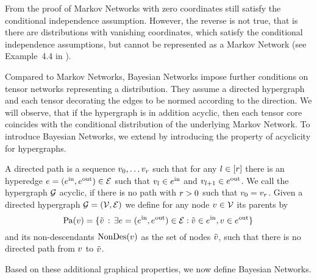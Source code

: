 From the proof of  Markov Networks with zero coordinates still satisfy the conditional independence assumption.
However, the reverse is not true, that is there are distributions with vanishing coordinates, which satisfy the conditional independence assumptions, but cannot be represented as a Markov Network (see Example~4.4 in \cite{koller_probabilistic_2009}).





Compared to Markov Networks, Bayesian Networks impose further conditions on tensor networks representing a distribution.
They assume a directed hypergraph and each tensor decorating the edges to be normed according to the direction.
We will observe, that if the hypergraph is in addition acyclic, then each tensor core coincides with the conditional distribution of the underlying Markov Network.
To introduce Bayesian Networks, we extend  by introducing the property of acyclicity for hypergraphs.


\begin{definition}
    A directed path is a sequence $v_{0},\ldots v_{r}$ such that for any $l\in[r]$ there is an hyperedge $e=(e^{\mathrm{in}},e^{\mathrm{out}})\in\mathcal{E}$ such that $v_{l}\in e^{\mathrm{in}}$ and $v_{l+1}\in e^{\mathrm{out}}$.
    We call the hypergraph $\mathcal{G}$ acyclic, if there is no path with $r>0$ such that $v_{0}=v_{r}$.
    Given a directed hypergraph $\mathcal{G}=(\mathcal{V},\mathcal{E})$ we define for any node $v\in\mathcal{V}$ its parents by
    \[ \mathrm{Pa}(v) = \{\tilde{v} \,:\,\exists e=(e^{\mathrm{in}},e^{\mathrm{out}})\in\mathcal{E}: \tilde{v}\in e^{\mathrm{in}},v\in e^{\mathrm{out}} \} \]
    and its non-descendants $\mathrm{NonDes}(v)$ as the set of nodes $\tilde{v}$, such that there is no directed path from $v$ to $\tilde{v}$.
\end{definition}

Based on these additional graphical properties, we now define Bayesian Networks.


